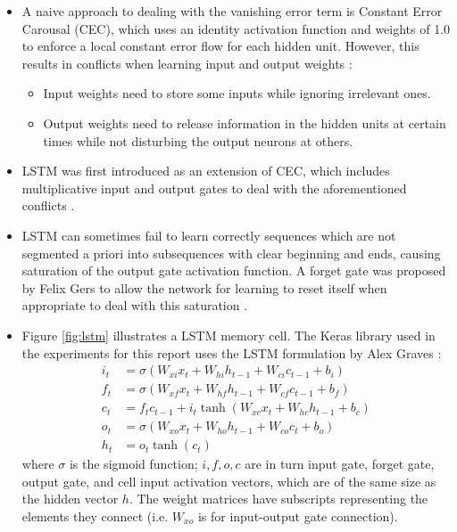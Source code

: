     \begin{itemize}
        \item A naive approach to dealing with the vanishing error term is Constant Error Carousal (CEC), which uses an identity activation function and weights of 1.0 to enforce a local constant error flow for each hidden unit. However, this results in conflicts when learning input and output weights \cite{Hochreiter:1997:LSM:1246443.1246450}:
        \begin{itemize}
            \item Input weights need to store some inputs while ignoring irrelevant ones.
            \item Output weights need to release information in the hidden units at certain times while not disturbing the output neurons at others.
        \end{itemize}
        \item LSTM was first introduced as an extension of CEC, which includes multiplicative input and output gates to deal with the aforementioned conflicts \cite{Hochreiter:1997:LSM:1246443.1246450}.
        \item LSTM can sometimes fail to learn correctly sequences which are not segmented a priori into subsequences with clear beginning and ends, causing saturation of the output gate activation function. A forget gate was proposed by Felix Gers to allow the network for learning to reset itself when appropriate to deal with this saturation \cite{Gers:2000:LFC:1121912.1121915}.
        \item Figure \ref{fig:lstm} illustrates a LSTM memory cell. The Keras library used in the experiments for this report uses the LSTM formulation by Alex Graves \cite{Graves2012-385, DBLP:journals/corr/Graves13}:
        \begin{align*}
        i_t & = \sigma(W_{xi}x_t + W_{hi}h_{t-1} + W_{ci}c_{t-1} + b_i) \\
        f_t & = \sigma(W_{xf}x_t + W_{hf}h_{t-1} + W_{cf}c_{t-1} + b_f) \\
        c_t & =  f_t c_{t-1} + i_t\tanh(W_{xc}x_t + W_{hc}h_{t-1} + b_c) \\
        o_t & = \sigma(W_{xo}x_t + W_{ho}h_{t-1} + W_{co}c_{t} + b_o) \\
        h_t & = o_t \tanh(c_t)
        \end{align*}
        where $\sigma$ is the sigmoid function; $i, f, o, c$ are in turn input gate, forget gate, output gate, and cell input activation vectors, which are of the same size as the hidden vector $h$. The weight matrices have subscripts representing the elements they connect (i.e. $W_{xo}$ is for input-output gate connection).
    \end{itemize}

